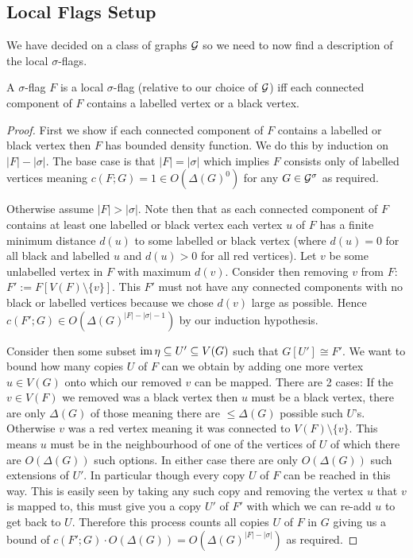 \subsection{Local Flags Setup}

We have decided on a class of graphs $\mathcal{G}$ so we need to now find a description of
the local $\sigma$-flags.

\begin{lemma}
    \label{lemma:pentagon_local_flags}
    A $\sigma$-flag $F$ is a local $\sigma$-flag (relative to our choice of
    $\mathcal{G}$) iff each connected component of $F$ contains a labelled vertex or a
    black vertex.
\end{lemma}

\begin{proof}
    First we show if each connected component of $F$ contains a labelled or black
    vertex then $F$ has bounded density function. We do this by induction on $|F|-|\sigma|$.
    The base case is that $|F|=|\sigma|$ which implies $F$ consists only of labelled
    vertices meaning $c(F; G) = 1 \in O(\Delta(G)^0)$ for any $G\in\mathcal{G}^\sigma$
    as required.

    Otherwise assume $|F|>|\sigma|$. Note then that as each connected component of
    $F$ contains at least one labelled or black vertex each vertex $u$ of $F$ has a
    finite minimum distance $d(u)$ to some labelled or black vertex (where
    $d(u)=0$ for all black and labelled $u$ and $d(u) > 0$ for all red vertices).
    Let $v$ be some unlabelled vertex in $F$ with maximum $d(v)$. Consider then removing $v$ from
    $F$: $F' := F[V(F)\setminus \{v\}]$. This $F'$ must not have any connected
    components with no black or labelled vertices because we chose $d(v)$ large as
    possible. Hence $c(F'; G) \in O\left(\Delta(G)^{|F|-|\sigma|-1}\right)$ by our
    induction hypothesis.

    Consider then some subset $\operatorname{im}\eta\subseteq U' \subseteq V(G)$ such that
    $G[U'] \cong F'$. We want to bound how many copies $U$ of $F$ can we obtain
    by adding one more vertex $u\in V(G)$ onto which our removed $v$ can be mapped.
    There are 2 cases: If the $v\in V(F)$ we removed was a black vertex then
    $u$ must be a black vertex, there are only $\Delta(G)$ of those meaning there
    are $\leq \Delta(G)$ possible such $U$'s. Otherwise $v$ was a red vertex
    meaning it was connected to $V(F)\setminus\{v\}$. This means $u$ must be
    in the neighbourhood of one of the vertices of $U$ of which there are
    $O(\Delta(G))$ such options. In either case there are only $O(\Delta(G))$ such
    extensions of $U'$.
    In particular though every copy $U$ of $F$ can be reached in this way. This is easily
    seen by taking any such copy and removing the vertex $u$ that $v$ is mapped to, this must
    give you a copy $U'$ of $F'$ with which we can re-add $u$ to get back to $U$.
    Therefore this process counts all copies $U$ of $F$ in $G$ giving us a bound of
    $c(F'; G) \cdot O(\Delta(G)) = O\left(\Delta(G)^{|F|-|\sigma|}\right)$ as required.


\end{proof}
